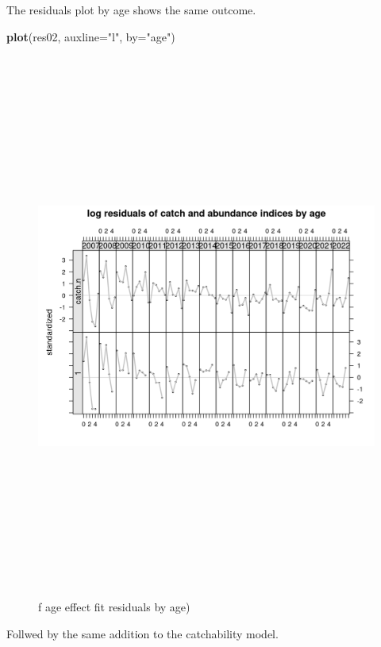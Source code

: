 \documentclass[
]{book}
\newenvironment{Shaded}{\begin{snugshade}}{\end{snugshade}}
\newcommand{\AttributeTok}[1]{\textcolor[rgb]{0.13,0.29,0.53}{#1}}
\newcommand{\FunctionTok}[1]{\textcolor[rgb]{0.13,0.29,0.53}{\textbf{#1}}}
\newcommand{\NormalTok}[1]{#1}
\newcommand{\StringTok}[1]{\textcolor[rgb]{0.31,0.60,0.02}{#1}}
\begin{document}
The residuals plot by age shows the same outcome.

\begin{Shaded}
\begin{Highlighting}[]
\FunctionTok{plot}\NormalTok{(res02, }\AttributeTok{auxline=}\StringTok{"l"}\NormalTok{, }\AttributeTok{by=}\StringTok{"age"}\NormalTok{)}
\end{Highlighting}
\end{Shaded}

\begin{figure}
\includegraphics[width=25cm,height=18cm,angle=90]{_bookdown_files/_main_files/figure-html/fageresbyage-1} \caption{f age effect fit residuals by age)}\label{fig:fageresbyage}
\end{figure}

Follwed by the same addition to the catchability model.
\end{document}
